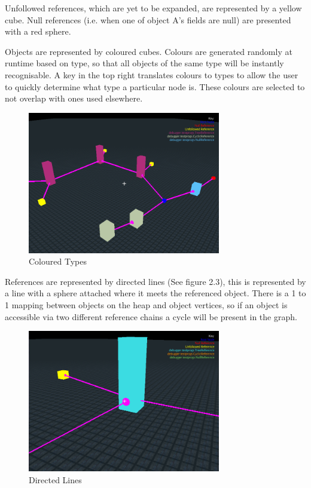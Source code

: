 \documentclass[11pt, a4paper]{report}
\begin{document}
Unfollowed references, which are yet to be expanded, are represented by a yellow cube.
Null references (i.e. when one of object A’s fields are null) are presented with a red sphere.

Objects are represented by coloured cubes. Colours are generated randomly at runtime based on type, so that all objects of the same type will be instantly recognisable. A key in the top right translates colours to types to allow the user to quickly determine what type a particular node is. These colours are selected to not overlap with ones used elsewhere.

\begin{figure}[h]
        \centering
        \includegraphics[width=0.75\textwidth]{images/final/random_colours.png}
        \caption{Coloured Types}
\end{figure}

References are represented by directed lines (See figure 2.3), this is represented by a line with a sphere attached where it meets the referenced object. There is a 1 to 1 mapping between objects on the heap and object vertices, so if an object is accessible via two different reference chains a cycle will be present in the graph.

\begin{figure}[h]
        \centering
        \includegraphics[width=0.75\textwidth]{images/final/directed_lines.png}
        \caption{Directed Lines}
\end{figure} 
\end{document}
